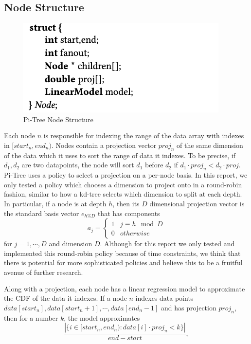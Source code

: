\documentclass[sigconf,10pt]{acmart}
\begin{document}
\subsection{Node Structure}

\begin{figure}
  \includegraphics[scale=0.5]{node_structure.png}
  \caption{Pi-Tree Node Structure}
  \label{Pi-TreeNode}
\end{figure}


Each node $n$ is responsible for indexing the range of the data array with indexes in $[start_n, end_n)$.
Nodes contain a projection vector $proj_n$ of the same dimension of the data
which it uses to sort the range of data it indexes. 
To be precise, if $d_1, d_2$ are two datapoints, the node will 
sort $d_1$ before $d_2$ if $d_1 \cdot proj_n < d_2 \cdot proj$.
Pi-Tree uses a policy to select a projection on a per-node basis. In this report,
we only tested a policy which chooses a dimension to project onto in a round-robin
fashion, similar to how a kd-tree selects which dimension to split at each depth.
In particular, if a node is at depth $h$, then its
$D$ dimensional projection vector is the standard basis vector $e_{h \% D}$ that has components 
$$a_j = \begin{cases} 
  1 & j \equiv h \mod D \\
  0 & otherwise
\end{cases}
$$
for $j=1, \cdots, D$ and dimension $D$. Although for this report we only 
tested and implemented this round-robin policy because of time constraints,
we think that there is potential
for more sophisticated policies and believe this to be a fruitful avenue of further
research.

Along with a projection, each node has a linear regression model 
to approximate the CDF of the data it indexes. If a node $n$ indexes data points
$data[start_n], data[start_n + 1], \cdots, data[end_n - 1]$ and has projection $proj_n$,
then for a number $k$, the
model approximates
\[ 
  \frac{|\{i \in [start_n, end_n) : data[i] \cdot proj_n < k\}|}{end - start},
\]
\end{document}
